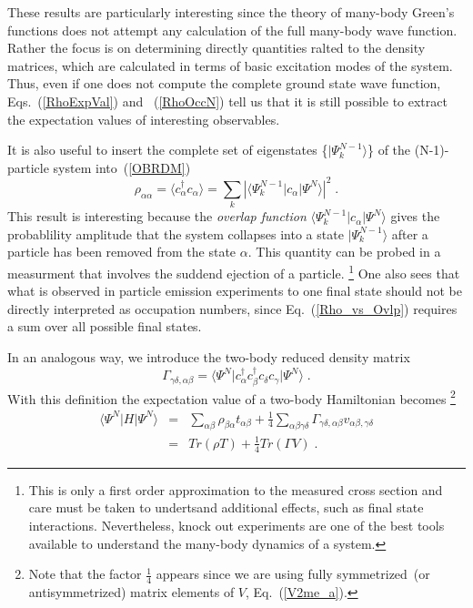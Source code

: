 These results are particularly interesting since the theory of many-body Green's functions does not attempt any calculation of the full many-body wave function. Rather the focus is on determining directly quantities ralted to the density matrices, which are calculated in terms of basic excitation modes of the system.
 Thus, even if one does not compute the complete ground state wave function, Eqs.~(\ref{RhoExpVal}) and ~(\ref{RhoOccN}) tell us that it is still possible to extract the expectation values of interesting observables.

It is also useful to insert the complete set of eigenstates \{$\vert\Psi_k^{N-1}\rangle$\} of the (N-1)-particle system into~(\ref{OBRDM})
\begin{equation}
 \rho_{\alpha \alpha}  = \langle c^\dag_\alpha c_\alpha \rangle =
   \sum_k \left| \langle \Psi_k^{N-1} \vert c_\alpha \vert\Psi^N\rangle \right|^2 \; .
\label{Rho_vs_Ovlp}
\end{equation}
This result is interesting because the {\em overlap function} $\langle \Psi_k^{N-1} \vert c_\alpha \vert\Psi^N\rangle$ gives the probablility amplitude that the system collapses into a state $\vert \Psi_k^{N-1}\rangle$ after a particle has been removed from the state $\alpha$. This quantity can be probed in a measurment that involves the suddend ejection of a particle.%
\footnote{This is only a first order approximation to the measured cross section and care must be taken to undertsand additional effects, such as final state interactions. Nevertheless, knock out experiments are one of the best tools available to understand the many-body dynamics of a system.}
One also sees that what is observed in particle emission experiments to one final state should not be directly interpreted as occupation numbers, since Eq.~(\ref{Rho_vs_Ovlp}) requires a sum over all possible final states.



In an analogous way, we introduce the two-body reduced density matrix 
\begin{equation}
\Gamma_{\gamma \delta, \alpha \beta} = \langle\Psi^N\vert c^\dag_\alpha c^\dag_\beta c_\delta c_\gamma \vert\Psi^N\rangle \; . 
\label{TBRDM}
\end{equation}
With this definition the expectation value of a two-body Hamiltonian becomes%
\footnote{Note that the factor $\frac{1}{4}$ appears since we are using fully symmetrized~(or antisymmetrized) matrix elements of $V$, Eq.~(\ref{V2me_a}).}
\begin{eqnarray}
\langle \Psi^N\vert H \vert\Psi^N\rangle &=&
  \sum_{\alpha \beta} \rho_{\beta \alpha}  t_{\alpha \beta}
  + \frac{1}{4} \sum_{\alpha \beta \gamma \delta} \Gamma_{\gamma \delta,\alpha \beta}
       v_{\alpha \beta, \gamma \delta}
\nonumber \\
  &=& Tr \left( \rho T \right) + \frac{1}{4} Tr \left( \Gamma V \right) \; .
\end{eqnarray}


